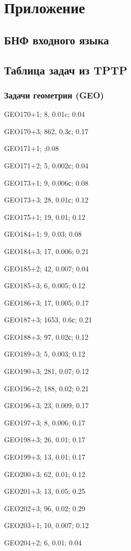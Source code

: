 \chapter*{Приложение}


\section{БНФ входного языка}


\section{Таблица задач из TPTP}

\subsection*{Задачи геометрии (GEO)}

GEO170+1; 8, 0.01c; 0.04

GEO170+3; 862, 0.3с; 0.17

GEO171+1; ;0.08

GEO171+2; 5, 0.002с; 0.04

GEO173+1; 9, 0.006с; 0.08

GEO173+3; 28, 0.01с; 0.12

GEO175+1; 19, 0.01; 0.12

GEO184+1; 9, 0.03; 0.08

GEO184+3; 17, 0.006; 0.21

GEO185+2; 42, 0.007; 0.04

GEO185+3; 6, 0.005; 0.12

GEO186+3; 17, 0.005; 0.17

GEO187+3; 1653, 0.6с; 0.21

GEO188+3; 97, 0.02с; 0.12

GEO189+3; 5, 0.003; 0.12

GEO190+3; 281, 0.07; 0.12

GEO196+2; 188, 0.02; 0.21

GEO196+3; 23, 0.009; 0.17

GEO197+3; 8, 0.006; 0.17

GEO198+3; 26, 0.01; 0.17

GEO199+3; 13, 0.01; 0.17

GEO200+3; 62, 0.01; 0.12

GEO201+3; 13, 0.05; 0.25

GEO202+3; 96, 0.02; 0.29

GEO203+1; 10, 0.007; 0.12

GEO204+2; 6, 0.01; 0.04


